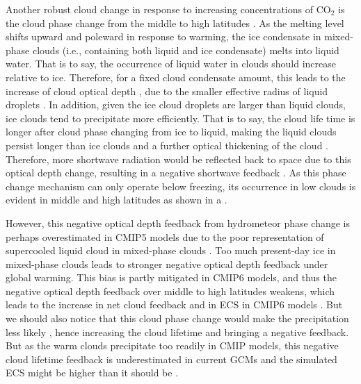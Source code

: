 Another robust cloud change in response to increasing concentrations of CO$_2$ is the cloud phase change from the middle to high latitudes \citep[e.g.,][]{Storelvmo2015cloud,Ceppi2016mechanisms,Tan2016observational,McCoy2016relationships}. As the melting level shifts upward and poleward in response to warming, the ice condensate in mixed-phase clouds (i.e., containing both liquid and ice condensate) melts into liquid water. That is to say, the occurrence of liquid water in clouds should increase relative to ice. Therefore, for a fixed cloud condensate amount, this leads to the increase of cloud optical depth \citep{Stephens1978radiation}, due to the smaller effective radius of liquid droplets \citep{Stubenrauch2013}. In addition, given the ice cloud droplets are larger than liquid clouds, ice clouds tend to precipitate more efficiently. That is to say, the cloud life time is longer after cloud phase changing from ice to liquid, making the liquid clouds persist longer than ice clouds and a further optical thickening of the cloud \citep{Storelvmo2015cloud,Ceppi2016mechanisms}. Therefore, more shortwave radiation would be reflected back to space due to this optical depth change, resulting in a negative shortwave feedback \citep[e.g.,][]{Zelinka2012computing1,Zelinka2012computing2,Zelinka2013contributions,Ceppi2016mechanisms,Tan2016observational,McCoy2016relationships,Zelinka2020causes,Bjordal2020equilibrium}. As this phase change mechanism can only operate below freezing, its occurrence in low clouds is evident in middle and high latitudes as shown in a \citep{Ceppi2017}. 


However, this negative optical depth feedback from hydrometeor phase change is perhaps overestimated in CMIP5 models due to the poor representation of supercooled liquid cloud in mixed-phase clouds \citep{Tan2016observational,Frey2018influence}. Too much present-day ice in mixed-phase clouds leads to stronger negative optical depth feedback under global warming. This bias is partly mitigated in CMIP6 models, and thus the negative optical depth feedback over middle to high latitudes weakens, which leads to the increase in net cloud feedback and in ECS in CMIP6 models \citep[e.g.,][]{Zelinka2020causes,Bjordal2020equilibrium}. But we should also notice that this cloud phase change would make the precipitation less likely \citep[e.g.,][]{Korolev2017mixed}, hence increasing the cloud lifetime and bringing a negative feedback. But as the warm clouds precipitate too readily in CMIP models, this negative cloud lifetime feedback is underestimated in current GCMs and the simulated ECS might be higher than it should be \citep{Mulmenstadt2021underestimated}.


